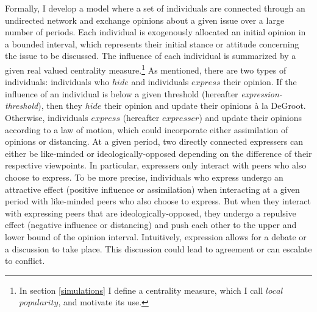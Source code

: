 \documentclass{article}
\begin{document}
Formally, I develop a model where a set of individuals are connected through an undirected network and exchange opinions about a given issue over a large number of periods. Each individual is exogenously allocated an initial opinion in a bounded interval, which represents their initial stance or attitude concerning the issue to be discussed. The influence of each individual is summarized by a given real valued centrality measure.\footnote{In section \ref{simulations} I define a centrality measure, which I call $local$ $popularity$, and motivate its use.} As mentioned, there are two types of individuals: individuals who $hide$ and individuals $express$ their opinion. If the influence of an individual is below a given threshold (hereafter \textit{expression-threshold}), then they $hide$ their opinion and update their opinions \`{a} la DeGroot. Otherwise, individuals $express$ (hereafter $expresser$) and update their opinions according to a law of motion, which could incorporate either assimilation of opinions or distancing. At a given period, two directly connected expressers can either be like-minded or ideologically-opposed depending on the difference of their respective viewpoints. In particular, expressers only interact with peers who also choose to express. To be more precise, individuals who express undergo an attractive effect (positive influence or assimilation) when interacting at a given period with like-minded peers who also choose to express. But when they interact with expressing peers that are ideologically-opposed, they undergo a repulsive effect (negative influence or distancing) and push each other to the upper and lower bound of the opinion interval. Intuitively, expression allows for a debate or a discussion to take place. This discussion could lead to agreement or can escalate to conflict. 
\bigskip

\bigskip
\end{document}
